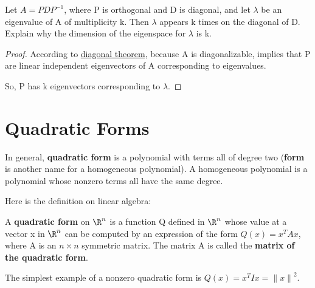 \begin{problem}\label{ex: 7.1.31}
    Let \(A = PDP^{-1}\), where P is orthogonal and D is diagonal, and let \(\lambda\) be an eigenvalue of A of multiplicity k. Then \(\lambda\) appears k times on the diagonal of D. Explain why the dimension of the eigenspace for \(\lambda\) is k.   
\end{problem}
\begin{proof}
    According to \hyperref[theorem: diagonal theorem]{diagonal theorem}, because A is diagonalizable, implies that P are linear independent eigenvectors of A corresponding to eigenvalues.

    So, P has k eigenvectors corresponding to \(\lambda\). 
\end{proof}


\section{Quadratic Forms}

In general, \textbf{quadratic form} is a polynomial with terms all of degree two (\textbf{form}  is another name for a homogeneous polynomial). A homogeneous polynomial is a polynomial whose nonzero terms all have the same degree.

Here is the definition on linear algebra:
\begin{definition}
    A \textbf{quadratic form} on \(\R^n\) is a function Q defined in \(\R^n\) whose value at a vector x in \(\R^n\) can be computed by an expression of the form \(Q(x) = x^T A x\), where A is an \(n \times n\)  symmetric matrix.      
    The matrix A is called the \textbf{matrix of the quadratic form}. 
\end{definition}

\begin{eg}
    The simplest example of a nonzero quadratic form is \(Q(x) = x^T I x = {\lVert x \lVert}^2\). 
\end{eg}

